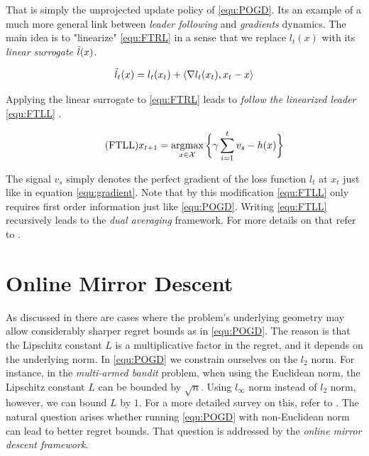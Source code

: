 That is simply the unprojected update policy of \ref{equ:POGD}. Its an example of a much more general link between \textit{leader following} and \textit{gradients} dynamics. The main idea is to "linearize" \ref{equ:FTRL} in a sense that we replace $l_t(x)$ with its \textit{linear surrogate} $\Tilde{l}(x)$.

\begin{equation*}
    \Tilde{l}_t(x) = l_t(x_t) + \langle \nabla l_t(x_t),x_t-x \rangle
\end{equation*}

Applying the linear surrogate to \ref{equ:FTRL} leads to \textit{follow the linearized leader} \ref{equ:FTLL} \cite{HDRmertikopoulos}. 

\begin{equation}
    \tag{FTLL}
    x_{t+1} = \operatorname*{\arg\!\max}_{x \in \mathcal{X}} \bigg\{\gamma\sum_{i=1}^t v_s - h(x)\bigg\}
    \label{equ:FTLL}
\end{equation}

The signal $v_s$ simply denotes the perfect gradient of the loss function $l_t$ at $x_t$ just like in equation \ref{equ:gradient}. Note that by this modification \ref{equ:FTLL} only requires first order information just like \ref{equ:POGD}. Writing \ref{equ:FTLL} recursively leads to the \textit{dual averaging} framework. For more details on that refer to \cite{HDRmertikopoulos, mertikopoulos}.


\section{Online Mirror Descent}\label{section:OnlineMirrorDescent}

As discussed in \cite{shalev, HDRmertikopoulos} there are cases where the problem's underlying geometry may allow considerably sharper regret bounds as in \ref{equ:POGD}. The reason is that the Lipschitz constant $L$ is a multiplicative factor in the regret, and it depends on the underlying norm. In \ref{equ:POGD} we constrain ourselves on the $l_2$ norm. For instance, in the \textit{multi-armed bandit} problem, when using the Euclidean norm, the Lipschitz constant $L$ can be bounded by $\sqrt{n}$. Using $l_\infty$ norm instead of $l_2$ norm, however, we can bound $L$ by $1$. For a more detailed survey on this, refer to \cite{shalev, HDRmertikopoulos}. The natural question arises whether running \ref{equ:POGD} with non-Euclidean norm can lead to better regret bounds. That question is addressed by the \textit{online mirror descent framework}. \\

